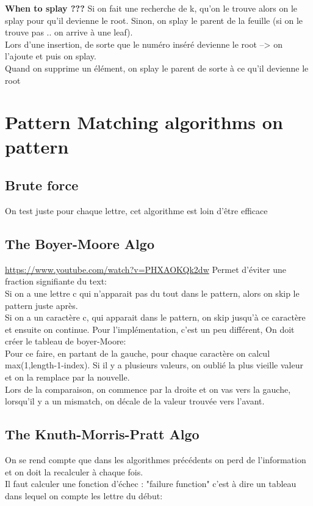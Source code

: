 \documentclass[a4paper]{article}
\begin{document}
\textbf{When to splay ???}
Si on fait une recherche de k, qu'on le trouve alors on le splay pour qu'il devienne le root. Sinon, on splay le parent de la feuille (si on le trouve pas .. on arrive à une leaf).\\
Lors d'une insertion, de sorte que le numéro inséré devienne le root --> on l'ajoute et puis on splay.\\
Quand on supprime un élément, on splay le parent de sorte à ce qu'il devienne le root

\section{Pattern Matching algorithms on pattern}

\subsection{Brute force}
On test juste pour chaque lettre, cet algorithme est loin d'être efficace

\subsection{The Boyer-Moore Algo}
\url{https://www.youtube.com/watch?v=PHXAOKQk2dw}
Permet d'éviter une fraction signifiante du text:\\
Si on a une lettre c qui n'apparait pas du tout dans le pattern, alors on skip le pattern juste après.\\
Si on a un caractère c, qui apparait dans le pattern, on skip jusqu'à ce caractère et ensuite on continue.
Pour l'implémentation, c'est un peu différent, On doit créer le tableau de boyer-Moore:\\
Pour ce faire, en partant de la gauche, pour chaque caractère on calcul max(1,length-1-index).
Si il y a plusieurs valeurs, on oublié la plus vieille valeur et on la remplace par la nouvelle.\\
Lors de la comparaison, on commence par la droite et on vas vers la gauche, lorsqu'il y a un mismatch, on décale de la valeur trouvée vers l'avant.

\subsection{The Knuth-Morris-Pratt Algo}
On se rend compte que dans les algorithmes précédents on perd de l'information et on doit la recalculer à chaque fois.\\
Il faut calculer une fonction d'échec : "failure function"
c'est à dire un tableau dans lequel on compte les lettre du début:
\end{document}
